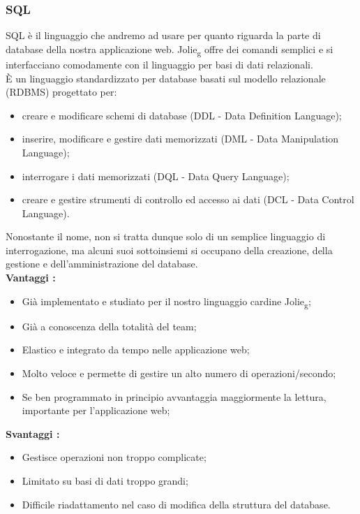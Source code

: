 {{		\subsubsection{SQL}{
			SQL è il linguaggio che andremo ad usare per quanto riguarda la parte di database della nostra applicazione web. Jolie\textsubscript{g} offre dei comandi semplici e si interfacciano comodamente con il linguaggio per basi di dati relazionali.\\
			È un linguaggio standardizzato per database basati sul modello relazionale (RDBMS) progettato per:
			\begin{itemize}
				\item creare e modificare schemi di database (DDL - Data Definition Language);
				\item inserire, modificare e gestire dati memorizzati (DML - Data Manipulation Language);
				\item interrogare i dati memorizzati (DQL - Data Query Language);
				\item creare e gestire strumenti di controllo ed accesso ai dati (DCL - Data Control Language).
			\end{itemize}
			Nonostante il nome, non si tratta dunque solo di un semplice linguaggio di interrogazione, ma alcuni suoi sottoinsiemi si occupano della creazione, della gestione e dell'amministrazione del database.\\
			\textbf{Vantaggi :}
			\begin{itemize}\itemsep1pt
				\item Già implementato e studiato per il nostro linguaggio cardine Jolie\textsubscript{g};
				\item Già a conoscenza della totalità del team;
				\item Elastico e integrato da tempo nelle applicazione web;
				\item Molto veloce e permette di gestire un alto numero di operazioni/secondo;
				\item Se ben programmato in principio avvantaggia maggiormente la lettura, importante per l'applicazione web;
				
			\end{itemize}
			\textbf{Svantaggi :}
			\begin{itemize}\itemsep1pt
				\item Gestisce operazioni non troppo complicate;
				\item Limitato su basi di dati troppo grandi;
				\item Difficile riadattamento nel caso di modifica della struttura del database.
			\end{itemize}
		}
	}
}
